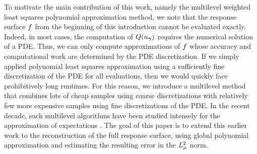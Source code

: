  To motivate the main contribution of this work, namely the multilevel weighted least squares polynomial approximation method, we note that the response surface $f$ from the beginning of this introduction cannot be evaluated exactly. Indeed, in most cases, the computation of $Q(u_{\bm{\gamma}})$ requires the numerical solution of a PDE. Thus, we can only compute approximations of $f$ whose accuracy and computational work are determined by the PDE discretization. If we simply applied  polynomial least squares approximation using a sufficiently fine discretization of the PDE for all evaluations, then we would quickly face prohibitively long runtimes. For this reason, we introduce a multilevel method that combines lots of cheap samples using coarse discretizations with relatively few more expensive samples using fine discretizations of the PDE. In the recent decade, such multilevel algorithms have been studied intensely for the approximation of expectations \cite{harbrecht2013multilevel,heinrich2001multilevel,KuoScheichlSchwabEtAl2015,Haji-AliNobileTamelliniEtAl2015}. The goal of this paper is to extend this earlier work to the reconstruction of the full response surface, using global polynomial approximation and estimating the resulting error in the $L^2_{\mu}$ norm.
 
